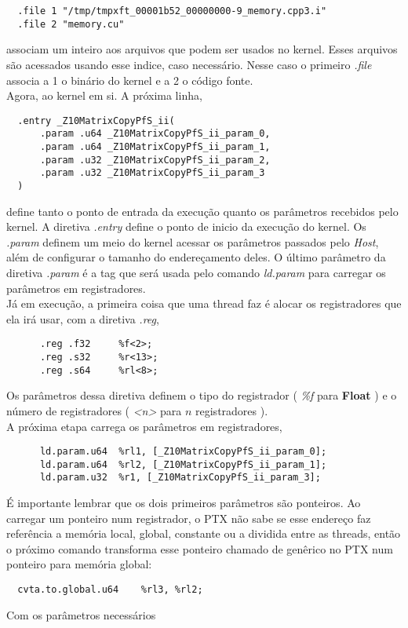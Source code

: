 \begin{lstlisting}
  .file	1 "/tmp/tmpxft_00001b52_00000000-9_memory.cpp3.i"
  .file	2 "memory.cu"
\end{lstlisting}

associam um inteiro aos arquivos que podem ser usados no kernel. Esses arquivos são acessados usando esse indice, caso necessário.
Nesse caso o primeiro \textit{.file} associa a 1 o binário do kernel e a 2 o código fonte. \\

Agora, ao kernel em si. A próxima linha,

\begin{lstlisting}
  .entry _Z10MatrixCopyPfS_ii(
	  .param .u64 _Z10MatrixCopyPfS_ii_param_0,
	  .param .u64 _Z10MatrixCopyPfS_ii_param_1,
	  .param .u32 _Z10MatrixCopyPfS_ii_param_2,
	  .param .u32 _Z10MatrixCopyPfS_ii_param_3
  )
\end{lstlisting}

define tanto o ponto de entrada da execução quanto os parâmetros recebidos pelo kernel. A diretiva \textit{.entry} define o ponto de inicio da execução do kernel.
Os \textit{.param} definem um meio do kernel acessar os parâmetros passados pelo \textit{Host}, além de configurar o tamanho do endereçamento deles. 
O último parâmetro da diretiva \textit{.param} é a tag que será usada pelo comando \textit{ld.param} para carregar os parâmetros em registradores. \\

Já em execução, a primeira coisa que uma thread faz é alocar os registradores que ela irá usar, com a diretiva \textit{.reg},

\begin{lstlisting}
	  .reg .f32 	%f<2>;
	  .reg .s32 	%r<13>;
	  .reg .s64 	%rl<8>;
\end{lstlisting}

Os parâmetros dessa diretiva definem o tipo do registrador ( \textit{\%f} para \textbf{Float} ) e o número de registradores ( \textit{<n>} para $n$ registradores ). \\

A próxima etapa carrega os parâmetros em registradores,

\begin{lstlisting}
	  ld.param.u64 	%rl1, [_Z10MatrixCopyPfS_ii_param_0];
	  ld.param.u64 	%rl2, [_Z10MatrixCopyPfS_ii_param_1];
	  ld.param.u32 	%r1, [_Z10MatrixCopyPfS_ii_param_3];
\end{lstlisting}

É importante lembrar que os dois primeiros parâmetros são ponteiros. Ao carregar um ponteiro num registrador, o PTX não sabe se esse endereço faz
referência a memória local, global, constante ou a dividida entre as threads, então o próximo comando transforma esse ponteiro chamado de genêrico
no PTX num ponteiro para memória global:

\begin{lstlisting}
  cvta.to.global.u64 	%rl3, %rl2;
\end{lstlisting}

Com os parâmetros necessários 
